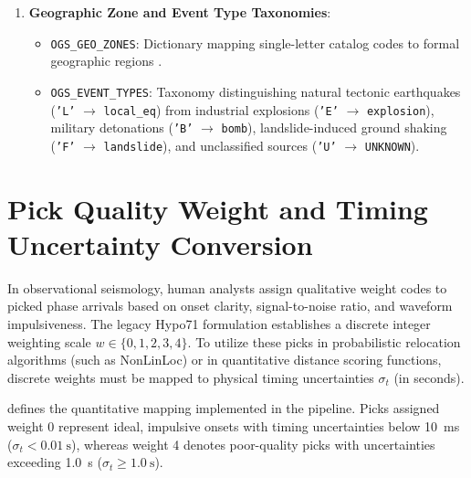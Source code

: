 \begin{enumerate}
  \item \textbf{Geographic Zone and Event Type Taxonomies}:
    \begin{itemize}
      \item \texttt{OGS\_GEO\_ZONES}: Dictionary mapping
        single-letter catalog codes to formal geographic regions
        .
      \item \texttt{OGS\_EVENT\_TYPES}: Taxonomy distinguishing
        natural tectonic earthquakes (\texttt{'L'} $\to$
        \texttt{local\_eq}) from industrial explosions (\texttt{'E'}
        $\to$ \texttt{explosion}), military detonations
        (\texttt{'B'} $\to$ \texttt{bomb}), landslide-induced ground
        shaking (\texttt{'F'} $\to$ \texttt{landslide}), and
        unclassified sources (\texttt{'U'} $\to$ \texttt{UNKNOWN}).
    \end{itemize}

\end{enumerate}

\section{Pick Quality Weight and Timing Uncertainty Conversion}
\label{sec:weight_conversion}

In observational seismology, human analysts assign qualitative
weight codes to picked phase arrivals based on onset clarity,
signal-to-noise ratio, and waveform impulsiveness. The legacy Hypo71
formulation \parencite{Hypo71} establishes a discrete integer weighting
scale $w \in \{0, 1, 2, 3, 4\}$. To utilize these picks in
probabilistic relocation algorithms (such as \ac{NonLinLoc}) or in
quantitative distance scoring functions, discrete weights must be
mapped to physical timing uncertainties $\sigma_t$ (in seconds).

 defines the quantitative mapping
implemented in the pipeline. Picks assigned weight \num{0} represent
ideal, impulsive onsets with timing uncertainties below \qty{10}{\milli\second}
($\sigma_t < \qty{0.01}{\second}$), whereas weight \num{4}
denotes poor-quality picks with uncertainties exceeding \qty{1.0}{\second}
($\sigma_t \ge \qty{1.0}{\second}$).

